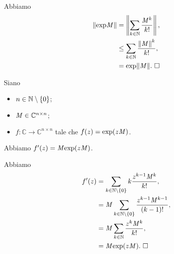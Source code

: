 \Proof Abbiamo
\begin{align*}
  \Norm{\Exponential{\Matrix}}
  &= \Norm{\sum_{k \in \mathbb{N}} \frac{\Matrix^k}{k!}},\\
  &\leq \sum_{k \in \mathbb{N}} \frac{\Norm{\Matrix}^k}{k!},\\
  &= \Exponential{\Norm{\Matrix}}.\text{ \EndProof}
\end{align*}
\begin{Theorem}
  Siano
  \begin{itemize}
    \item $n \in \mathbb{N} \setminus \lbrace 0 \rbrace$;
    \item $\mathit{M} \in \mathbb{C}^{n \times n}$;
    \item $f: \mathbb{C} \rightarrow \mathbb{C}^{n \times n}$ tale che
      $f(z) = \text{exp}(z\mathit{M})$.
  \end{itemize}
  Abbiamo $f'(z) = \mathit{M} \text{exp}(z \mathit{M})$.
\end{Theorem}
\Proof Abbiamo
\begin{align*}
  f'(z)
    &= \sum_{k \in \mathbb{N} \setminus \lbrace 0 \rbrace} k \frac{z^{k - 1} \mathit{M}^k}{k!},\\
    &= \mathit{M} \sum_{k \in \mathbb{N} \setminus \lbrace 0 \rbrace} \frac{z^{k - 1}\mathit{M}^{k - 1}}{(k - 1)!},\\
    &= \mathit{M} \sum_{k \in \mathbb{N}} \frac{z^k \mathit{M}^k}{k!},\\
    &= \mathit{M} \text{exp}(z \mathit{M}).\text{ $\square$}
\end{align*}
